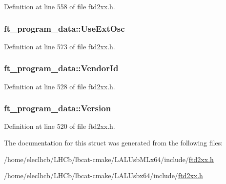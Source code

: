 Definition at line 558 of file ftd2xx.h.\hypertarget{structft__program__data_a93dee33ac5847f65157c3c5e374fa4ea}{
\subsubsection[{UseExtOsc}]{ {\bf ft\_\-program\_\-data::UseExtOsc}}}
\label{structft__program__data_a93dee33ac5847f65157c3c5e374fa4ea}


Definition at line 573 of file ftd2xx.h.\hypertarget{structft__program__data_a4d4e65a934b3a822d90d2b2fc461cb11}{
\subsubsection[{VendorId}]{ {\bf ft\_\-program\_\-data::VendorId}}}
\label{structft__program__data_a4d4e65a934b3a822d90d2b2fc461cb11}


Definition at line 528 of file ftd2xx.h.\hypertarget{structft__program__data_a9ef2eb59fe9ef1699df92a9d50ac3a81}{
\subsubsection[{Version}]{ {\bf ft\_\-program\_\-data::Version}}}
\label{structft__program__data_a9ef2eb59fe9ef1699df92a9d50ac3a81}


Definition at line 520 of file ftd2xx.h.

The documentation for this struct was generated from the following files:\begin{DoxyCompactItemize}
\item 
/home/eleclhcb/LHCb/lbcat-\/cmake/LALUsbMLx64/include/\hyperlink{LALUsbMLx64_2include_2ftd2xx_8h}{ftd2xx.h}\item 
/home/eleclhcb/LHCb/lbcat-\/cmake/LALUsbx64/include/\hyperlink{LALUsbx64_2include_2ftd2xx_8h}{ftd2xx.h}\end{DoxyCompactItemize}
